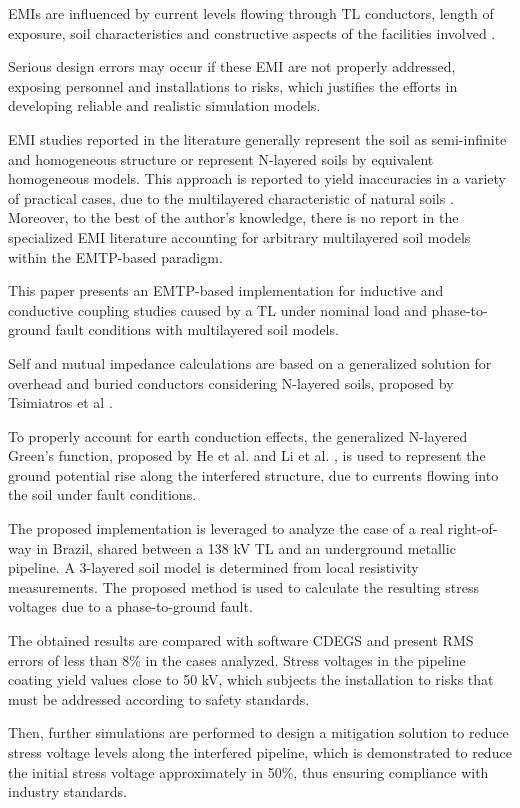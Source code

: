 \documentclass{IEEEtran4PSCC}
\begin{document}
EMIs are influenced by current levels flowing through TL conductors, length of exposure, soil characteristics and constructive aspects of the facilities involved \cite{CIGREWG36}. 

Serious design errors may occur if these EMI are not properly addressed, exposing personnel and installations to risks, which justifies the efforts in developing reliable and realistic simulation models.

EMI studies reported in the literature generally represent the soil as semi-infinite and homogeneous structure or represent N-layered soils by equivalent homogeneous models. This  approach is reported to yield inaccuracies in a variety of practical cases, due to the multilayered characteristic of natural soils  \cite{Qi2013,Wu2017,Alexandru2020}. Moreover, to the best of the author's knowledge, there is no report in the specialized EMI literature accounting for arbitrary multilayered soil models within the EMTP-based paradigm.

This paper presents an EMTP-based implementation for inductive and conductive coupling studies caused by a TL under nominal load and phase-to-ground fault conditions with multilayered soil models.

Self and mutual impedance calculations are based on a generalized solution for overhead and buried conductors considering N-layered soils, proposed by Tsimiatros et al \cite{Tsiamitros2008a}.

To properly account for earth conduction effects, the generalized N-layered Green's function, proposed by He et al. \cite{He2012} and Li et al. \cite{Li2006}, is used to represent the ground potential rise along the interfered structure, due to currents flowing into the soil under fault conditions.

The proposed implementation is leveraged to analyze the case of a real right-of-way in Brazil, shared between a 138 kV TL and an underground metallic pipeline. A 3-layered soil model is determined from local resistivity measurements. The proposed method is used to calculate the resulting stress voltages due to a phase-to-ground fault. 

The obtained results are compared with software CDEGS and present RMS errors of less than 8\% in the cases analyzed. Stress voltages in the pipeline coating yield values close to 50 kV, which subjects the installation to risks that must be addressed according to safety standards. 

Then, further simulations are performed to design a mitigation solution to reduce stress voltage levels along the interfered pipeline, which is demonstrated to reduce the initial stress voltage approximately in 50\%, thus ensuring compliance with industry standards.
\end{document}
